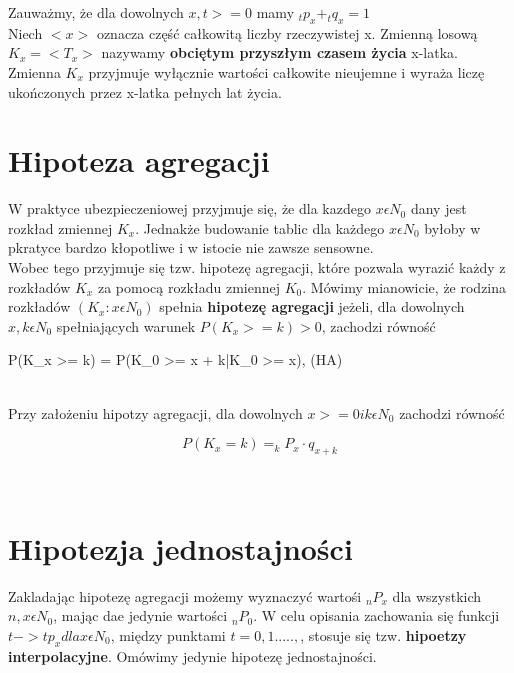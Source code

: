 \documentclass{article}
\begin{document}
Zauważmy, że dla dowolnych $ x,t >= 0  $ mamy $ _tp_x + _tq_x = 1 $\\

Niech $ < x > $ oznacza część całkowitą liczby rzeczywistej x. Zmienną losową $ K_x = < T_x > $ nazywamy \textbf{obciętym przyszłym czasem życia} x-latka. Zmienna $ K_x $ przyjmuje wyłącznie wartości całkowite nieujemne i wyraża liczę ukończonych przez x-latka pełnych lat życia. \\

\newpage

\section{Hipoteza agregacji}

W praktyce ubezpieczeniowej przyjmuje się, że dla kazdego $ x \epsilon N_0 $ dany jest rozkład zmiennej $ K_x $. Jednakże budowanie tablic dla każdego $  x \epsilon N_0$ byłoby w pkratyce bardzo kłopotliwe i w istocie nie zawsze sensowne.\\

Wobec tego przyjmuje się tzw. hipotezę agregacji, które pozwala wyrazić każdy z rozkładów $ K_x $ za pomocą rozkładu zmiennej $ K_0 $. Mówimy mianowicie, że rodzina rozkładów $ (K_x : x \epsilon N_0) $ spełnia \textbf{hipotezę agregacji} jeżeli, dla dowolnych $ x,k \epsilon N_0 $ spełniających warunek $ P(K_x >= k) > 0 $, zachodzi równość

\begin{center}
		P(K_x >= k) = P(K_0 >= x + k|K_0 >= x), (HA)
\end{center}\\

Przy założeniu hipotzy agregacji, dla dowolnych $ x >= 0 i k \epsilon N_0 $ zachodzi równość

\begin{center}
	\begin{equation}
		P(K_x = k) = _kP_x\cdot q_{x+k}
	\end{equation}
\end{center}\\

\newpage

\section{Hipotezja jednostajności}

Zakladając hipotezę agregacji możemy wyznaczyć wartośi $ _nP_x $ dla wszystkich $ n, x \epsilon N_0 $, mając dae jedynie wartości $ _nP_0 $. W celu opisania zachowania się funkcji $ t -> t p_x dla x \epsilon N_0 $, między punktami $ t = 0,1.....,$, stosuje się tzw. \textbf{hipoetzy interpolacyjne}. Omówimy jedynie hipotezę jednostajności.\\
\end{document}
